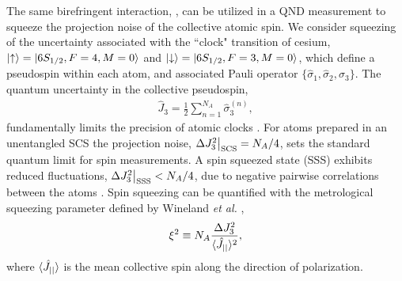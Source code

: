 \documentclass[preprint,aps,pra,onecolumn]{revtex4-1} %
\newcommand{\scs}{{\rm SCS}}
\newcommand{\varz}{\Delta J_3^2}
\newcommand{\jz}{\hat{J}_3}
\newcommand{\half}{\smallfrac{1}{2}}
\begin{document}
The same birefringent interaction, , can be utilized in a QND measurement to squeeze the projection noise of the collective atomic spin.  We consider squeezing of the uncertainty associated with the ``clock" transition of cesium, $\lvert{\uparrow}\rangle = \lvert{6S_{1/2}, F=4, M=0}\rangle$ and $\lvert{\downarrow}\rangle = \lvert{6S_{1/2}, F=3, M=0}\rangle$, which define a pseudospin within each atom, and associated Pauli operator $\{\hat{\sigma}_1, \hat{\sigma}_2, \hat{\sigma}_3\}$.  The quantum uncertainty in the collective pseudospin,
	\begin{align}
		\jz = \frac{1}{2} \sum_{n=1}^{N_A} \hat{\sigma}_3^{(n)},  
	\end{align}
fundamentally limits the precision of atomic clocks \cite{wineland_spin_1992}. For atoms prepared in an unentangled SCS the projection noise, $\varz \big|_{\scs} = N_A/4$, sets the standard quantum limit for spin measurements. A spin squeezed state (SSS) exhibits reduced fluctuations, $ \varz \big|_{\rm SSS}  < N_A/4$, due to negative pairwise correlations between the atoms \cite{norris_enhanced_2012}. Spin squeezing can be quantified with the metrological squeezing parameter defined by Wineland \emph{et al.} \cite{wineland_spin_1992},
	\begin{align} \label{Eq::SqueezingParameter}
		\xi^2 \equiv N_A \frac{ \varz }{ \expt{\hat{J}_{||}}^2 },
	\end{align}
where $\langle{\hat{J}_{||}}\rangle$ is the mean collective spin along the direction of polarization. 
\end{document}
